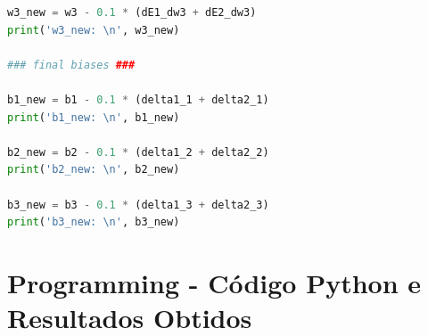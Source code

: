 \documentclass[a4paper,12pt]{article} %
\begin{document}
\begin{enumerate}
\begin{lstlisting}[language=Python]
w3_new = w3 - 0.1 * (dE1_dw3 + dE2_dw3)
print('w3_new: \n', w3_new)

### final biases ###

b1_new = b1 - 0.1 * (delta1_1 + delta2_1)
print('b1_new: \n', b1_new)

b2_new = b2 - 0.1 * (delta1_2 + delta2_2)
print('b2_new: \n', b2_new)

b3_new = b3 - 0.1 * (delta1_3 + delta2_3)
print('b3_new: \n', b3_new)
\end{lstlisting}

\end{enumerate}

\clearpage

\section*{Programming - Código Python e Resultados Obtidos}
\end{document}
